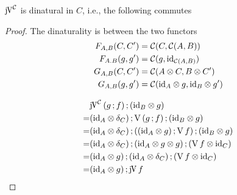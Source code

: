 \documentclass[runningheads,envcountsame]{llncs}
\begin{document}
\begin{lemma}
    $\juncurry[\C]$ is dinatural in $C$, i.e., the following commutes
    \begin{center}
    \end{center}
\end{lemma}
\begin{proof}
    The dinaturality is between the two functors
    \begin{align}
        F_{A,B}(C, C') &= \C(C, \homC{A}{B}) \\
        F_{A.B}(g, g') &= \C(g, \id_{\homC{A}{B}}) \\
        G_{A,B}(C, C') &= \C(\tensor{A}{C}, \tensor{B}{C'}) \\
        G_{A,B}(g, g') &= \C(\tensor{\id_A}{g}, \tensor{\id_B}{g'})
    \end{align}
    
    \begin{align}
        & \comp{\juncurry[\C]\,(\comp{g}{f})}{(\tensor{\id_B}{g})} \\
      = & \comp{\comp{(\tensor{\id_A}{\dup_C})}{\uncurry\,(\comp{g}{f})}}{(\tensor{\id_B}{g})} \\
      = & \comp{\comp{(\tensor{\id_A}{\dup_C})}{(\comp{(\tensor{\id_A}{g})}{\uncurry\,f})}}{(\tensor{\id_B}{g})} \\
      = & \comp{\comp{(\tensor{\id_A}{\dup_C})}{(\tensor{\id_A}{\tensor{g}{g}})}}{(\tensor{\uncurry\,f}{\id_C})} \\
      = & \comp{(\tensor{\id_A}{g})}{\comp{(\tensor{\id_A}{\dup_C})}{(\tensor{\uncurry\,f}{\id_C})}} \\
      = & \comp{(\tensor{\id_A}{g})}{\juncurry\,f}
    \end{align}
\end{proof}
\end{document}
